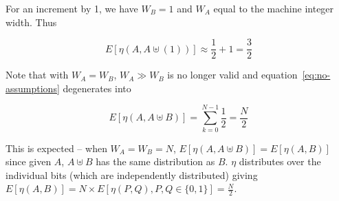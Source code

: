 For an increment by 1, we have $W_B = 1$ and $W_A$ equal to the
machine integer width.  Thus

\begin{equation}
  \label{proof:average-2-flips}
  E[\eta(A, A \uplus (1))] \approx \frac{1}{2} + 1 = \frac{3}{2}
\end{equation}

Note that with $W_A = W_B$, $W_A \gg W_B$ is no longer valid and
equation~\ref{eq:no-assumptions} degenerates into

\begin{equation}
  E[\eta(A, A \uplus B)] = \displaystyle\sum\limits_{k=0}^{N - 1} \frac{1}{2} =
  \frac{N}{2}
\end{equation}

This is expected -- when $W_A = W_B = N$, $E[\eta(A, A \uplus B)] =
E[\eta(A, B)]$ since given $A$, $A \uplus B$ has the same distribution as
$B$.  $\eta$ distributes over the individual bits (which are
independently distributed) giving $E[\eta(A, B)] = N \times E[\eta(P,
  Q), P, Q \in \{0, 1\}] = \frac{N}{2}$.
 
